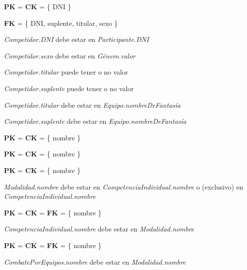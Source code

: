 
\textbf{PK} = \textbf{CK} = \{ DNI \}

\textbf{FK} = \{ DNI, suplente, titular, sexo \}

\textit{Competidor.DNI} debe estar en \textit{Participante.DNI}

\textit{Competidor.sexo} debe estar en \textit{Género.valor}

\textit{Competidor.titular} puede tener o no valor

\textit{Competidor.suplente} puede tener o no valor

\textit{Competidor.titular} debe estar en \textit{Equipo.nombreDeFantas\'ia}

\textit{Competidor.suplente} debe estar en \textit{Equipo.nombreDeFantas\'ia}\\


\textbf{PK} = \textbf{CK} = \{ nombre \}\\


\textbf{PK} = \textbf{CK} = \{ nombre \}\\


\textbf{PK} = \textbf{CK} = \{ nombre \}

\textit{Modalidad.nombre} debe estar en \textit{CompetenciaIndividual.nombre} o (exclusivo) en \textit{CompetenciaIndividual.nombre}\\


\textbf{PK} = \textbf{CK} = \textbf{FK} = \{ nombre \}

\textit{CompetenciaIndividual.nombre} debe estar en \textit{Modalidad.nombre}\\


\textbf{PK} = \textbf{CK} = \textbf{FK} = \{ nombre \}

\textit{CombatePorEquipos.nombre} debe estar en \textit{Modalidad.nombre}\\



